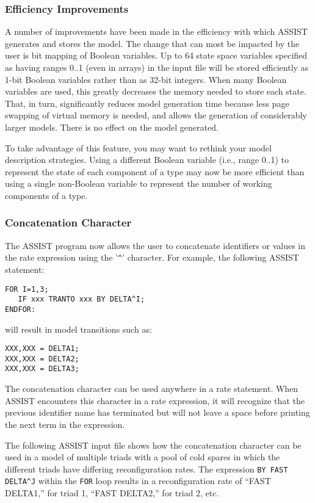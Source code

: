 \subsubsection{Efficiency Improvements}
 
     A number of improvements have been made in the efficiency with which
ASSIST generates and stores the model.  The change that can most be impacted
by the user is bit mapping of Boolean variables.  Up to 64 state space
variables specified as having ranges 0..1 (even in arrays) in the input file
will be stored efficiently as 1-bit Boolean variables rather than as 32-bit
integers.  When many Boolean variables are used, this greatly decreases the
memory needed to store each state.  That, in turn, significantly reduces
model generation time because less page swapping of virtual memory is
needed, and allows the generation of considerably larger models.  There is no
effect on the model generated.
 
     To take advantage of this feature, you may want to rethink your model
description strategies.  Using a different Boolean variable (i.e., range
0..1) to represent the state of each component of a type may now be more
efficient than using a single non-Boolean variable to represent the number of
working components of a type.

\subsubsection{Concatenation Character}
     The ASSIST program now allows the user to concatenate identifiers or 
values in the rate expression using the '\verb'^'' character.  For example, the
following ASSIST statement:
\begin{verbatim}
FOR I=1,3;
   IF xxx TRANTO xxx BY DELTA^I;
ENDFOR:
\end{verbatim}
will result in model transitions such as:
\begin{verbatim}
XXX,XXX = DELTA1;
XXX,XXX = DELTA2;
XXX,XXX = DELTA3;
\end{verbatim}
The concatenation character can be used anywhere in a rate statement.
When ASSIST encounters this character in a rate expression, it will 
recognize that the previous identifier name has terminated but will not leave
a space before printing the next term in the expression.

The following ASSIST input file shows how the concatenation character
can be used in a model of multiple triads with a pool of cold spares in
which the different triads have differing reconfiguration rates.
The expression \verb'BY FAST DELTA^J'
within the \verb'FOR' loop results in a reconfiguration rate of
``FAST DELTA1,'' for triad 1, ``FAST DELTA2,'' for triad 2, etc.

